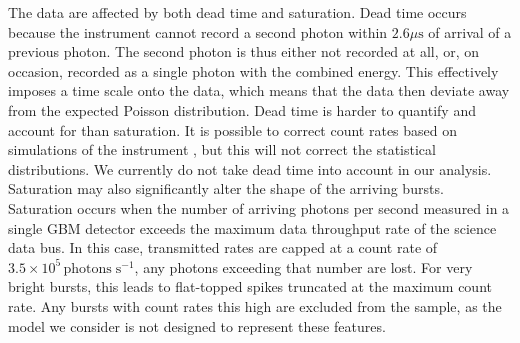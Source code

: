 \documentclass[12pt]{emulateapj}
\newcommand{\project}[1]{\textsl{#1}}
\newcommand{\rxte}{\project{RXTE}}
\newcommand{\counts}{y}
\begin{document}
The data are affected by both dead time and saturation. 
Dead time occurs because the instrument cannot record a second photon within $2.6\mu\mathrm{s}$ of arrival of a previous photon. 
The second photon is thus either not recorded at all, or, on occasion, recorded as a single photon with the combined energy. This effectively 
imposes a time scale onto the data, which means that the data then deviate away from the expected Poisson distribution. 
Dead time is harder to quantify and account for than saturation. It is possible to correct count rates based on simulations of the instrument \citep{meegan2009,briggs2010,chaplin2013},
but this will not correct the statistical distributions. We currently do not take dead time into account in our analysis.   Saturation may also significantly alter the shape of the arriving bursts. Saturation occurs when the number of arriving photons per second
measured in a single GBM detector exceeds the maximum data throughput rate of the science data bus. In this case, transmitted rates are capped at a 
count rate of $3.5 \times 10^{5} \, \mathrm{photons} \; \mathrm{s}^{-1}$, any photons exceeding that number are lost. For very bright bursts, this leads
to flat-topped spikes truncated at the maximum count rate. Any bursts with count rates this high are excluded from the sample, as the model we
consider is not designed to represent these features. 


\end{document}
